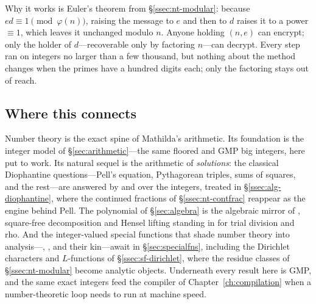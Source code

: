 Why it works is Euler's theorem from \S\ref{ssec:nt-modular}: because \(ed\equiv1\pmod{\varphi(n)}\),
raising the message to \(e\) and then to \(d\) raises it to a power \(\equiv1\), which
leaves it unchanged modulo \(n\). Anyone holding \((n,e)\) can encrypt; only the holder of
\(d\)---recoverable only by factoring \(n\)---can decrypt. Every step ran on integers no
larger than a few thousand, but nothing about the method changes when the primes have a
hundred digits each; only the factoring stays out of reach.

\subsection*{Where this connects}

Number theory is the exact spine of Mathilda's arithmetic. Its foundation is the integer
model of \S\ref{sec:arithmetic}---the same floored  and GMP big integers, here put
to work. Its natural sequel is the arithmetic of \emph{solutions}: the classical Diophantine
questions---Pell's equation, Pythagorean triples, sums of squares, and the rest---are
answered by  and  over the integers, treated in
\S\ref{ssec:alg-diophantine}, where the continued fractions of \S\ref{ssec:nt-contfrac}
reappear as the engine behind Pell. The polynomial  of \S\ref{sec:algebra} is the
algebraic mirror of , square-free decomposition and Hensel lifting
standing in for trial division and rho. And the integer-valued special functions that shade
number theory into analysis---, , and their kin---await in
\S\ref{sec:specialfns}, including the Dirichlet characters and \(L\)-functions of
\S\ref{ssec:sf-dirichlet}, where the residue classes of \S\ref{ssec:nt-modular} become
analytic objects. Underneath every result here is GMP, and the same exact integers
feed the compiler of Chapter~\ref{ch:compilation} when a number-theoretic loop needs to run
at machine speed.
